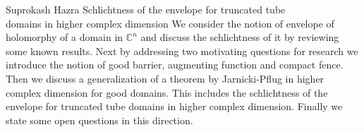 \talk
{%
    Suprokash Hazra
}
{%
    Schlichtness of the envelope for truncated tube\\domains in higher complex dimension
}
{%
    We consider the notion of envelope of holomorphy of a domain
    in $\mathbb{C}^n$ and discuss the schlichtness of it by reviewing
    some known results. Next by addressing two motivating
    questions for research we introduce the notion of good
    barrier, augmenting function and compact fence. Then we
    discuss a generalization of a theorem by Jarnicki-Pflug in
    higher complex dimension for good domains. This includes the
    schlichtness of the envelope for truncated tube domains in
    higher complex dimension. Finally we state some open
    questions in this direction.
}

